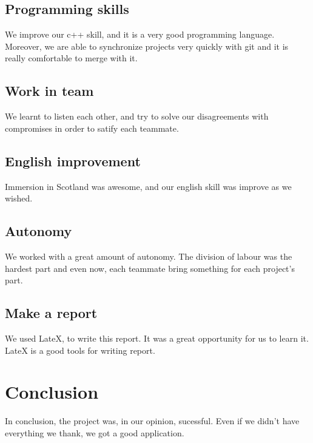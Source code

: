 \documentclass{scrreprt}
\begin{document}
					\section{Programming skills}
					We improve our c++ skill,  and it is a very good programming language.
					Moreover, we are able to synchronize projects very quickly with git and it is really comfortable to merge with it.
					\section{Work in team}
					We learnt to listen each other, and try to solve our disagreements with compromises in order to satify each teammate.
					\section{English improvement}
					Immersion in Scotland was awesome, and our english skill was improve as we wished.
					\section{Autonomy}
					We worked with a great amount of autonomy. The division of labour was the hardest part and even now, each teammate bring something for each project's part.
					\section{Make a report}
					We used LateX, to write this report. It was a great opportunity for us to learn it. LateX is a good tools for writing report.

					\chapter*{Conclusion} %
					In conclusion, the project was, in our opinion, sucessful. Even if we didn't have everything we thank, we got a good application. 

					\appendix
\end{document}
